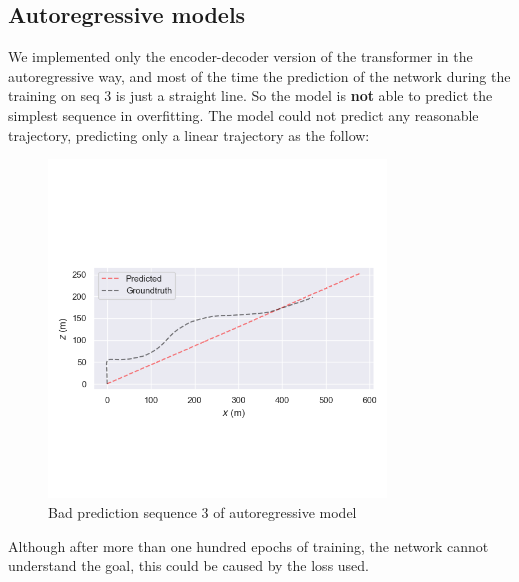 \subsection{Autoregressive models}\label{subsec:autoregressive-model}
We implemented only the encoder-decoder version of the transformer in the autoregressive way, and most of the time the prediction of the network during the training on seq 3 is just a straight line.
So the model is \textbf{not} able to predict the simplest sequence in overfitting.
The model could not predict any reasonable trajectory, predicting only a linear trajectory as the follow:
\begin{figure}[H]
    \centering
    \includegraphics[width=0.8\textwidth]{images/1_4_autoregressive_prediction}
    \caption{Bad prediction sequence 3 of autoregressive model}\label{fig:autoregressive-seq-3}
\end{figure}
Although after more than one hundred epochs of training, the network cannot understand the goal, this could be caused by the loss used.
